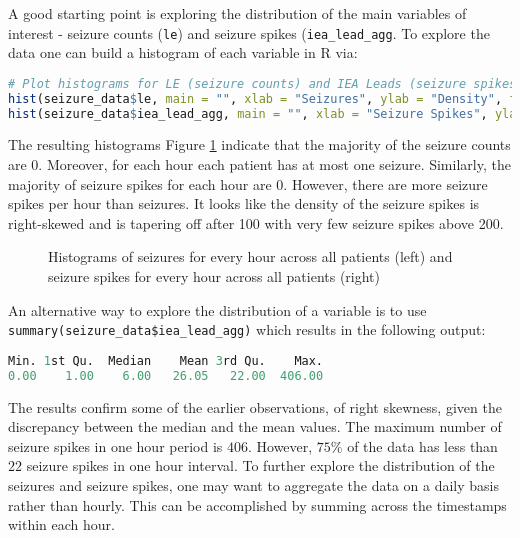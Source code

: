 A good starting point is exploring the distribution of the main variables of interest - seizure counts (\verb|le|) and seizure spikes (\verb|iea_lead_agg|. To explore the data one can build a histogram of each variable in R via:
\begin{lstlisting}[language=R]
# Plot histograms for LE (seizure counts) and IEA Leads (seizure spikes)
hist(seizure_data$le, main = "", xlab = "Seizures", ylab = "Density", freq=FALSE)
hist(seizure_data$iea_lead_agg, main = "", xlab = "Seizure Spikes", ylab = "Density", freq=FALSE)
\end{lstlisting}
The resulting histograms Figure \ref{fig:seizures} indicate that the majority of the seizure counts are 0. Moreover, for each hour each patient has at most one seizure. Similarly, the majority of seizure spikes for each hour are 0. However, there are more seizure spikes per hour than seizures. It looks like the density of the seizure spikes is right-skewed and is tapering off after 100 with very few seizure spikes above 200.
\begin{figure}[H]
  \begin{minipage}[b]{0.5\linewidth}
    \centering

  \end{minipage}
  \begin{minipage}[b]{0.5\linewidth}
    \centering
  \end{minipage}
  \label{fig:seizures}
  \caption{Histograms of seizures for every hour across all patients (left) and seizure spikes for every hour across all patients (right)}
\end{figure}
An alternative way to explore the distribution of a variable is to use \verb|summary(seizure_data$iea_lead_agg)| which results in the following output:
\begin{lstlisting}[language=R]
Min. 1st Qu.  Median    Mean 3rd Qu.    Max.
0.00    1.00    6.00   26.05   22.00  406.00
\end{lstlisting}
The results confirm some of the earlier observations, of right skewness, given the discrepancy between the median and the mean values. The maximum number of seizure spikes in one hour period is $406$. However, $75\%$ of the data has less than $22$ seizure spikes in one hour interval.
To further explore the distribution of the seizures and seizure spikes, one may want to aggregate the data on a daily basis rather than hourly. This can be accomplished by summing across the timestamps within each hour.
